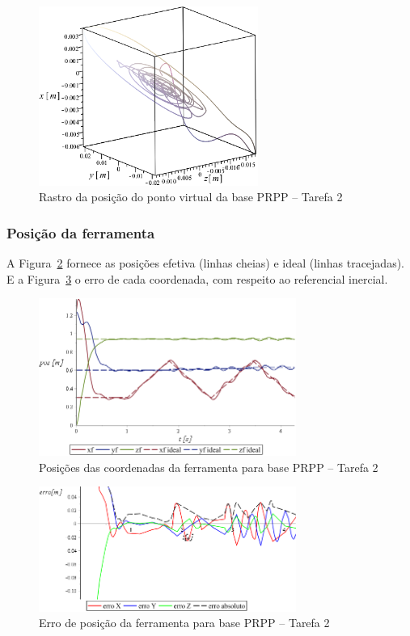 \begin{figure}[h!]
	\centering 
 	\includegraphics[width=0.64\textwidth]{figs/t2_pvirtural_base_prpp}
 	\caption{Rastro da posição do ponto virtual da base PRPP -- Tarefa 2}
 	\label{fig::t2_pvirtural_base_prpp}
\end{figure}

\subsubsection{Posição da ferramenta}

A Figura~\ref{fig::t2_posf_base_prpp} fornece as posições efetiva (linhas cheias)
e ideal (linhas tracejadas). E a Figura~\ref{fig::t2_erroposf_base_prpp} o erro
de cada coordenada, com respeito ao referencial inercial.

\begin{figure}[h!]
	\centering 
 	\includegraphics[width=0.75\textwidth]{figs/t2_posf_base_prpp}
 	\caption{Posições das coordenadas da ferramenta para base PRPP -- Tarefa
 	2}
 	\label{fig::t2_posf_base_prpp}
\end{figure}

\begin{figure}[h!]
	\centering 
 	\includegraphics[width=0.75\textwidth]{figs/t2_erroposf_base_prpp}
 	\caption{Erro de posição da ferramenta para base PRPP -- Tarefa 2}
 	\label{fig::t2_erroposf_base_prpp}
\end{figure}

